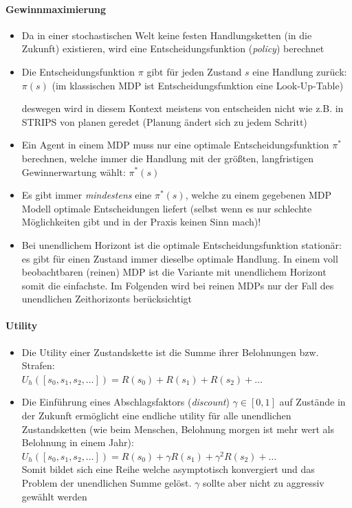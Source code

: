 \paragraph{Gewinnmaximierung}
\begin{itemize}
	\item Da in einer stochastischen Welt keine festen Handlungsketten (in die Zukunft) existieren, wird eine Entscheidungsfunktion (\emph{policy}) berechnet
	\item Die Entscheidungsfunktion $\pi$ gibt f\"ur jeden Zustand $s$ eine Handlung zur\"uck: $\pi(s)$ (im klassischen MDP ist Entscheidungsfunktion eine Look-Up-Table)
	\begin{itemize}
		\ita deswegen wird in diesem Kontext meistens von \glqq entscheiden\grqq{} nicht wie z.B. in STRIPS von \glqq planen\grqq{} geredet (Planung ändert sich zu jedem Schritt)
	\end{itemize}
	\item Ein Agent in einem MDP muss nur eine optimale Entscheidungsfunktion $\pi^*$ berechnen, welche immer die Handlung mit der gr\"o{\ss}ten, langfristigen Gewinnerwartung w\"ahlt: $\pi^* (s)$
	\item Es gibt immer \textit{mindestens} eine $\pi^* (s)$, welche zu einem gegebenen MDP Modell optimale Entscheidungen liefert (selbst wenn es nur schlechte Möglichkeiten gibt und in der Praxis keinen Sinn mach)!
	\item Bei unendlichem Horizont ist die optimale Entscheidungsfunktion station\"ar: es gibt f\"ur einen Zustand immer dieselbe optimale Handlung. In einem voll beobachtbaren (reinen) MDP ist die Variante mit unendlichem Horizont somit die einfachste. Im Folgenden wird bei reinen MDPs nur der Fall des unendlichen Zeithorizonts ber\"ucksichtigt
\end{itemize}

\paragraph{Utility}
\begin{itemize}
	\item Die Utility einer Zustandskette ist die Summe ihrer Belohnungen bzw. Strafen:\\ $U_h(\left[s_0, s_1, s_2, \ldots \right]) = R(s_0) + R(s_1) + R(s_2) + \ldots$
	\item Die Einf\"uhrung eines Abschlagsfaktors (\emph{discount})  $\gamma \in \left[0,1\right]$ auf Zust\"ande  in der Zukunft erm\"oglicht eine endliche utility f\"ur alle unendlichen Zustandsketten (wie beim Menschen, Belohnung morgen ist mehr wert als Belohnung in einem Jahr):\\ $U_h(\left[s_0, s_1, s_2, \ldots \right]) = R(s_0) + \gamma R(s_1) + \gamma^2 R(s_2) + \ldots$\\
	Somit bildet sich eine Reihe welche asymptotisch konvergiert und das Problem der unendlichen Summe gelöst. $\gamma$ sollte aber nicht zu aggressiv gewählt werden
\end{itemize}

